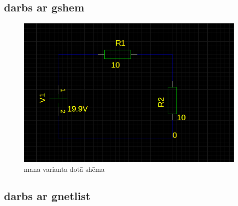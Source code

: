 \documentclass{report}
\begin{document}
\subsection{darbs ar gshem}
\begin{figure}[!h]
\includegraphics[width=12cm]{01_sch.png}
\caption{mana varianta dotā shēma}
\end{figure}
\subsection{darbs ar gnetlist}

\end{document}
